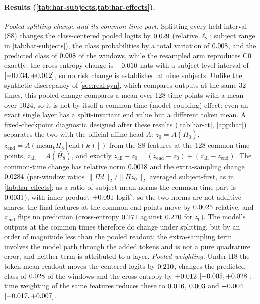 \documentclass{article}
\theoremstyle{plain}
\theoremstyle{definition}
\theoremstyle{remark}
\begin{document}



\paragraph{Results (\cref{tab:har-subjects,tab:har-effects}).}
\emph{Pooled splitting change and its common-time part.}
Splitting every held interval (S8) changes the class-centered pooled logits by $0.029$ (relative $\ell_2$; subject range in \cref{tab:har-subjects}), the class probabilities by a total variation of $0.008$, and the predicted class of $0.008$ of the windows, while the resampled arm reproduces C0 exactly; the cross-entropy change is $-0.010$ nats with a subject-level interval of $[-0.034,+0.012]$, so no risk change is established at nine subjects.
Unlike the synthetic discrepancy of \cref{sec:real-syn}, which compares outputs at the same 32 times, this pooled change compares a mean over 128 time points with a mean over 1024, so it is not by itself a common-time (model-coupling) effect: even an exact single layer has a split-invariant end value but a different token mean.
A fixed-checkpoint diagnostic designed after these results (\cref{tab:har-ct}, \cref{app:har}) separates the two with the official affine head $A$: $z_0=A(\overline{H_0})$, $z_{\mathrm{end}}=A(\mathrm{mean}_kH_8[\mathrm{end}(k)])$ from the S8 features at the 128 common time points, $z_{\mathrm{all}}=A(\overline{H_8})$, and exactly $z_{\mathrm{all}}-z_0=(z_{\mathrm{end}}-z_0)+(z_{\mathrm{all}}-z_{\mathrm{end}})$.
The common-time change has relative norm $0.0018$ and the extra-sampling change $0.0284$ (per-window ratios $\|\Pi d\|_2/\|\Pi z_0\|_2$ averaged subject-first, as in \cref{tab:har-effects}; as a ratio of subject-mean norms the common-time part is $0.0031$), with inner product $+0.091$ logit$^2$, so the two norms are not additive shares; the final features at the common end points move by $0.0025$ relative, and $z_{\mathrm{end}}$ flips no prediction (cross-entropy $0.271$ against $0.270$ for $z_0$).
The model's outputs at the common times therefore do change under splitting, but by an order of magnitude less than the pooled readout; the extra-sampling term involves the model path through the added tokens and is not a pure quadrature error, and neither term is attributed to a layer.
\emph{Pooled weighting.}
Under H8 the token-mean readout moves the centered logits by $0.210$, changes the predicted class of $0.028$ of the windows and the cross-entropy by $+0.012$ $[-0.005,+0.028]$; time weighting of the same features reduces these to $0.016$, $0.003$ and $-0.004$ $[-0.017,+0.007]$.
\end{document}
